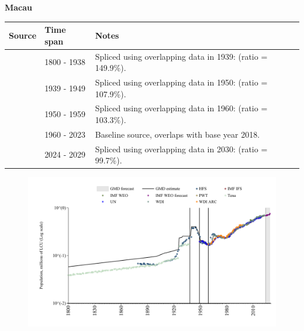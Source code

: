 \documentclass[12pt,a4paper,landscape]{article}
\begin{document}
\begin{adjustbox}{max totalsize={\paperwidth}{\paperheight},center}
\begin{minipage}[t][\textheight][t]{\textwidth}
\vspace*{0.5cm}
{}
\begin{center}
{\Large\bfseries Macau}
\end{center}
\vspace{0.5cm}
\begin{table}[H]
\centering
\small
\begin{tabular}{|l|l|l|}
\hline
\textbf{Source} & \textbf{Time span} & \textbf{Notes} \\
\hline
\rowcolor{white}\cite{Tena}& 1800 - 1938 &Spliced using overlapping data in 1939: (ratio = 149.9\%).\\
\rowcolor{lightgray}\cite{HFS}& 1939 - 1949 &Spliced using overlapping data in 1950: (ratio = 107.9\%).\\
\rowcolor{white}\cite{IMF_IFS}& 1950 - 1959 &Spliced using overlapping data in 1960: (ratio = 103.3\%).\\
\rowcolor{lightgray}\cite{WDI}& 1960 - 2023 &Baseline source, overlaps with base year 2018.\\
\rowcolor{white}\cite{IMF_WEO_forecast}& 2024 - 2029 &Spliced using overlapping data in 2030: (ratio = 99.7\%).\\
\hline
\end{tabular}
\end{table}
\begin{figure}[H]
\centering
\includegraphics[width=\textwidth,height=0.6\textheight,keepaspectratio]{graphs/MAC_pop.pdf}
\end{figure}
\end{minipage}
\end{adjustbox}
\end{document}
